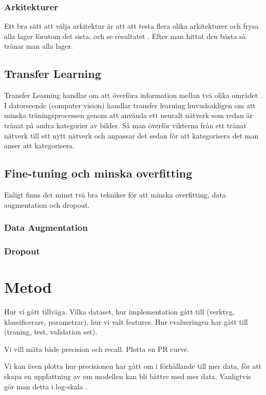 \documentclass{kththesis}
\begin{document}
  

    \subsection{Arkitekturer}
    Ett bra sätt att välja arkitektur är att att testa flera olika arkitekturer och frysa alla lager förutom det sista, och se resultatet \parencite{Goodfellow-et-al-2016}. Efter man hittat den bästa så tränar man alla lager.

  \section{Transfer Learning}
  Transfer Learning handlar om att överföra information mellan två olika området \parencite{oquab_learning_2014}. I datorseende (computer vision) handlar transfer learning huvudsakligen om att minska träningsprocessen genom att använda ett neuralt nätverk som redan är tränat på andra kategorier av bilder. Så man överför vikterna från ett tränat nätverk till ett nytt nätverk och anpassar det sedan för att kategorisera det man anser att kategorisera.

  \section{Fine-tuning och minska overfitting}
  Enligt \cite{krizhevsky_imagenet_2012} finns det minst två bra tekniker för att minska overfitting, data augmentation och dropout.

    \subsection{Data Augmentation}

    \subsection{Dropout}

\chapter{Metod}
Hur vi gått tillväga. Vilka dataset, hur implementation gått till (verktyg, klassificerare, parametrar), hur vi valt features.
Hur evalueringen har gått till (traning, test, validation set).

Vi vill mäta både precision och recall. Plotta en PR curve.

Vi kan även plotta hur precisionen har gått om i förhållande till mer data, för att skapa en uppfattning av om modellen kan bli bättre med mer data. Vanligtvis gör man detta i log-skala \parencite{Goodfellow-et-al-2016}. 
\end{document}
